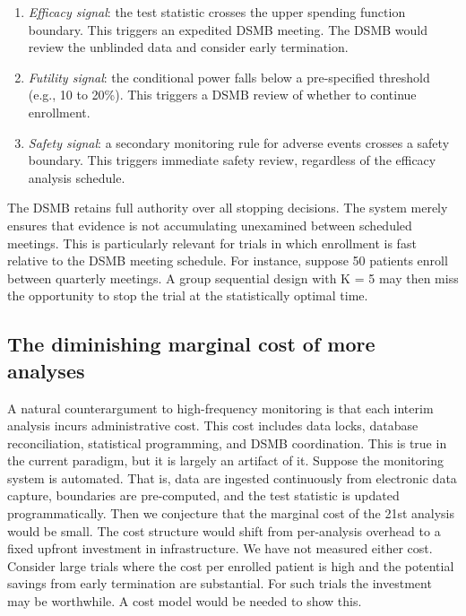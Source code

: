 \documentclass[
  11pt,
]{article}
\providecommand{\tightlist}{%
  \setlength{\itemsep}{0pt}\setlength{\parskip}{0pt}}
\begin{document}
\begin{enumerate}
\def\labelenumi{\arabic{enumi}.}
\tightlist
\item
  \emph{Efficacy signal}: the test statistic crosses the
  upper spending function boundary. This triggers an
  expedited DSMB meeting. The DSMB would review the
  unblinded data and consider early termination.
\item
  \emph{Futility signal}: the conditional power falls
  below a pre-specified threshold (e.g., 10 to 20\%).
  This triggers a DSMB review of whether to continue
  enrollment.
\item
  \emph{Safety signal}: a secondary monitoring rule for
  adverse events crosses a safety boundary. This
  triggers immediate safety review, regardless of the
  efficacy analysis schedule.
\end{enumerate}

The DSMB retains full authority over all stopping
decisions. The system merely ensures that evidence is
not accumulating unexamined between scheduled meetings.
This is particularly relevant for trials in which
enrollment is fast relative to the DSMB meeting
schedule. For instance, suppose 50 patients enroll
between quarterly meetings. A group sequential design
with K = 5 may then miss the opportunity to stop the
trial at the statistically optimal time.

\subsection{The diminishing marginal cost of more analyses}\label{the-diminishing-marginal-cost-of-more-analyses}

A natural counterargument to high-frequency monitoring
is that each interim analysis incurs administrative
cost. This cost includes data locks, database
reconciliation, statistical programming, and DSMB
coordination. This is true in the current paradigm, but
it is largely an artifact of it. Suppose the monitoring
system is automated. That is, data are ingested
continuously from electronic data capture, boundaries
are pre-computed, and the test statistic is updated
programmatically. Then we conjecture that the marginal
cost of the 21st analysis would be small. The cost
structure would shift from per-analysis overhead to a
fixed upfront investment in infrastructure. We have
not measured either cost. Consider large trials where
the cost per enrolled patient is high and the potential
savings from early termination are substantial. For
such trials the investment may be worthwhile. A cost
model would be needed to show this.
\end{document}
